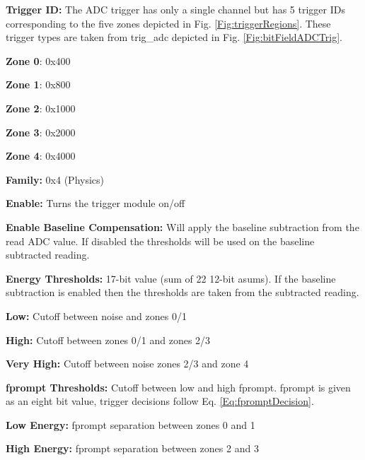 \begin{description}

\item \textbf{Trigger ID: } The ADC trigger has only a single channel but has 5 trigger IDs corresponding to the five zones depicted in Fig. \ref{Fig:triggerRegions}. These trigger types are taken from trig\_adc depicted in Fig. \ref{Fig:bitFieldADCTrig}.
	\begin{description}
	\item \textbf{Zone 0}: 0x400
	\item \textbf{Zone 1}: 0x800
	\item \textbf{Zone 2}: 0x1000
	\item \textbf{Zone 3}: 0x2000
	\item \textbf{Zone 4}: 0x4000
	\end{description}

\item \textbf{Family: }0x4 (Physics)

\item \textbf{Enable: }Turns the trigger module on/off

\item \textbf{Enable Baseline Compensation: }Will apply the baseline subtraction from the read ADC value. If disabled the thresholds will be used on the baseline subtracted reading. 

\item \textbf{Energy Thresholds: }17-bit value (sum of 22 12-bit \gls{asum}s). If the baseline subtraction is enabled then the thresholds are taken from the subtracted reading.
	\begin{description}
	\item \textbf{Low: }Cutoff between noise and zones 0/1
	\item \textbf{High: }Cutoff between zones 0/1 and zones 2/3
	\item \textbf{Very High: }Cutoff between noise zones 2/3 and zone 4 
	\end{description}

\item \textbf{\gls{fprompt} Thresholds: }Cutoff between low and high \gls{fprompt}. \gls{fprompt} is given as an eight bit value, trigger decisions follow Eq. \eqref{Eq:fpromptDecision}.
	\begin{description}
	\item \textbf{Low Energy: }\gls{fprompt} separation between zones 0 and 1
	\item \textbf{High Energy: }\gls{fprompt} separation between zones 2 and 3
	\end{description} 
	

\end{description}
